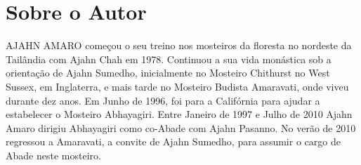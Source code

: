 \chapter{Sobre o Autor}

{\firaSansLightFont AJAHN AMARO} começou o seu treino nos mosteiros da floresta no nordeste
da Tailândia com Ajahn Chah em 1978. Continuou a sua vida monástica sob
a orientação de Ajahn Sumedho, inicialmente no Mosteiro Chithurst no
West Sussex, em Inglaterra, e mais tarde no Mosteiro Budista Amaravati,
onde viveu durante dez anos. Em Junho de 1996, foi para a Califórnia
para ajudar a estabelecer o Mosteiro Abhayagiri. Entre Janeiro de 1997 e
Julho de 2010 Ajahn Amaro dirigiu Abhayagiri como co-Abade com Ajahn
Pasanno. No verão de 2010 regressou a Amaravati, a convite de Ajahn
Sumedho, para assumir o cargo de Abade neste mosteiro.
